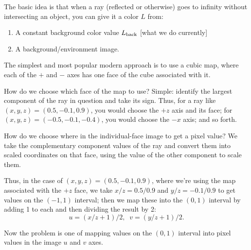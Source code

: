 \documentclass[11pt]{article}
\begin{document}
The basic idea is that when a ray (reflected or otherwise) goes to infinity without
intersecting an object, you can give it a color $L$ from:
\begin{enumerate}
\item A constant background color value $L_{\rm back}$ [what we do currently]

\item A background/environment image.
\end{enumerate}

The simplest and most popular modern approach is to use a cubic map, where each of the
$+$ and $-$ axes has one face of the cube associated with it.

How do we choose which face of the map to use? Simple: identify the largest component
of the ray in question and take its sign. Thus, for a ray like $(x, y, z) = (0.5, -0.1, 0.9)$,
you would choose the $+z$ axis and its face; for $(x, y, z) = (-0.5, -0.1, -0.4)$, you
would choose the $-x$ axis; and so forth.

How do we choose where in the individual-face image to get a pixel value? We take the
complementary component values of the ray and convert them into scaled coordinates on that face,
using the value of the other component to scale them.

Thus, in the case of $(x, y, z) = (0.5, -0.1, 0.9)$, where we're using the map associated
with the $+z$ face, we take $x/z = 0.5/0.9$ and $y/z = -0.1/0.9$ to get values on the $(-1,1)$
interval; then we map these into the $(0,1)$ interval by adding 1 to each and then dividing the
result by 2:
\begin{equation}
u = (x/z + 1)/2, \; \; v = (y/z + 1)/2 .
\end{equation}

Now the problem is one of mapping values on the $(0,1)$ interval into pixel values
in the image $u$ and $v$ axes.
\end{document}
